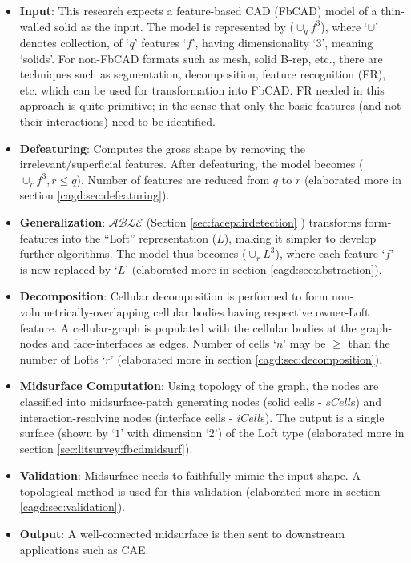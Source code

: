\begin{itemize}[noitemsep,topsep=2pt,parsep=2pt,partopsep=2pt,leftmargin=*]
\item \textbf{Input}: This research expects a feature-based CAD (FbCAD) model of a thin-walled solid as the input.  The model is represented by  ($\cup_qf^3$), where `$\cup$' denotes  collection, of `$q$' features `$f$', having dimensionality `$3$', meaning `solids'. For non-FbCAD formats such as mesh, solid B-rep, etc., there are techniques such as segmentation, decomposition, feature recognition (FR), etc. which can be used for transformation into FbCAD. FR needed in this approach is quite primitive; in the sense that only the basic features (and not their interactions) need to be identified.

\item \textbf{Defeaturing}:  Computes the gross shape by removing the irrelevant/superficial features. After defeaturing, the model becomes ($\cup_rf^3, r \leq q$). Number of features are reduced from $q$ to $r$ \cite{YogeshCADConf2015} (elaborated more in section \ref{cagd:sec:defeaturing}). 

\item \textbf{Generalization}: $\mathcal{ABLE}$ (Section \ref{sec:facepairdetection} ) transforms form-features into the ``Loft'' representation ($L$), making it simpler to develop further algorithms. The model thus becomes ($\cup_rL^3$), where each feature `$f$' is now replaced by `$L$' \cite{YogeshIITG2014}  (elaborated more in  section  \ref{cagd:sec:abstraction}). 

\item \textbf{Decomposition}: Cellular decomposition is performed to form non-volumetrically-overlapping cellular bodies having respective owner-Loft feature. A cellular-graph is populated with the cellular bodies at the graph-nodes and face-interfaces as edges. Number of cells `$n$' may be $\geq$ than the number of Lofts `$r$' (elaborated more in section \ref{cagd:sec:decomposition}).

\item \textbf{Midsurface Computation}: Using topology of the graph, the nodes are classified into midsurface-patch generating nodes (solid cells - $sCell$s) and interaction-resolving nodes (interface cells - $iCell$s).  The output is a single surface (shown by `$1$'  with dimension `$2$') of the Loft type (elaborated more in section \ref{sec:litsurvey:fbcdmidsurf}).

\item \textbf{Validation}:  Midsurface needs to faithfully mimic the input shape. A topological method is used for this validation \cite{YogeshCADandA2015} (elaborated more in section \ref{cagd:sec:validation}).

\item \textbf{Output}: A well-connected midsurface is then sent to downstream applications such as CAE.
\end{itemize}

